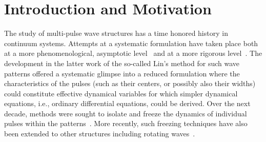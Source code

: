 \documentclass[12pt]{article}
\begin{document}
\begin{abstract}
    In the present work we revisit the existence 
    of multi-pulse solutions in discrete systems.
    We provide a general framework for the study
    of such wave patterns based on a discrete
    analogue of Lin's method previously used in
    the continuum realm. We develop explicit conditions
    for the existence of $m$-pulse structures and
    subsequently develop a reduced matrix allowing to
    address their spectral stability. As a prototypical
    example for the manifestation of the details of
    the formulation, we consider the discrete nonlinear
    Schr{\"o}dinger equation. Different families
    of $2$- and $3$-pulse solitary waves are discussed
    and analytical expressions for the corresponding 
    stability eigenvalues obtained in very good agreement
    with numerical results. The systematic continuation of
    the families of solutions is explored numerically 
    corroborating the analytical results.
    \end{abstract}

\section{Introduction and Motivation}

The study of multi-pulse wave structures has a time
honored history in continuum systems. Attempts at
a systematic formulation have taken place both at
a more phenomenological, asymptotic level~\cite{elphick}
and at a more rigorous level~\cite{Sandstede1998}.
The development in the latter work of the so-called
Lin's method for such wave patterns offered a 
systematic glimpse into a reduced formulation where
the characteristics of the pulses (such as their centers,
or possibly also their widths) could constitute effective
dynamical variables for which simpler dynamical equations,
i.e., ordinary differential equations, could be derived.
Over the next decade, methods were sought to 
isolate and freeze the dynamics of individual pulses
within the patterns~\cite{beyn1,beyn2}. More recently,
such freezing techniques have also been extended to other
structures including rotating waves~\cite{beyn3}. 
\end{document}
